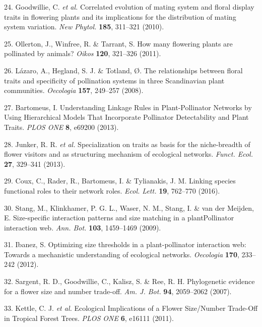 \documentclass[
  12pt,
  a4paper,
]{article}
\begin{document}
\leavevmode\hypertarget{ref-goodwillie2010}{}%
24. Goodwillie, C. \emph{et al.} Correlated evolution of mating system and floral display traits in flowering plants and its implications for the distribution of mating system variation. \emph{New Phytol.} \textbf{185}, 311--321 (2010).

\leavevmode\hypertarget{ref-ollerton2011}{}%
25. Ollerton, J., Winfree, R. \& Tarrant, S. How many flowering plants are pollinated by animals? \emph{Oikos} \textbf{120}, 321--326 (2011).

\leavevmode\hypertarget{ref-lazaro2008}{}%
26. Lázaro, A., Hegland, S. J. \& Totland, Ø. The relationships between floral traits and specificity of pollination systems in three Scandinavian plant communities. \emph{Oecologia} \textbf{157}, 249--257 (2008).

\leavevmode\hypertarget{ref-bartomeus2013}{}%
27. Bartomeus, I. Understanding Linkage Rules in Plant-Pollinator Networks by Using Hierarchical Models That Incorporate Pollinator Detectability and Plant Traits. \emph{PLOS ONE} \textbf{8}, e69200 (2013).

\leavevmode\hypertarget{ref-junker2013}{}%
28. Junker, R. R. \emph{et al.} Specialization on traits as basis for the niche-breadth of flower visitors and as structuring mechanism of ecological networks. \emph{Funct. Ecol.} \textbf{27}, 329--341 (2013).

\leavevmode\hypertarget{ref-coux2016}{}%
29. Coux, C., Rader, R., Bartomeus, I. \& Tylianakis, J. M. Linking species functional roles to their network roles. \emph{Ecol. Lett.} \textbf{19}, 762--770 (2016).

\leavevmode\hypertarget{ref-stang2009}{}%
30. Stang, M., Klinkhamer, P. G. L., Waser, N. M., Stang, I. \& van der Meijden, E. Size-specific interaction patterns and size matching in a plantPollinator interaction web. \emph{Ann. Bot.} \textbf{103}, 1459--1469 (2009).

\leavevmode\hypertarget{ref-ibanez2012}{}%
31. Ibanez, S. Optimizing size thresholds in a plant-pollinator interaction web: Towards a mechanistic understanding of ecological networks. \emph{Oecologia} \textbf{170}, 233--242 (2012).

\leavevmode\hypertarget{ref-sargent2007}{}%
32. Sargent, R. D., Goodwillie, C., Kalisz, S. \& Ree, R. H. Phylogenetic evidence for a flower size and number trade-off. \emph{Am. J. Bot.} \textbf{94}, 2059--2062 (2007).

\leavevmode\hypertarget{ref-kettle2011}{}%
33. Kettle, C. J. \emph{et al.} Ecological Implications of a Flower Size/Number Trade-Off in Tropical Forest Trees. \emph{PLOS ONE} \textbf{6}, e16111 (2011).
\end{document}
